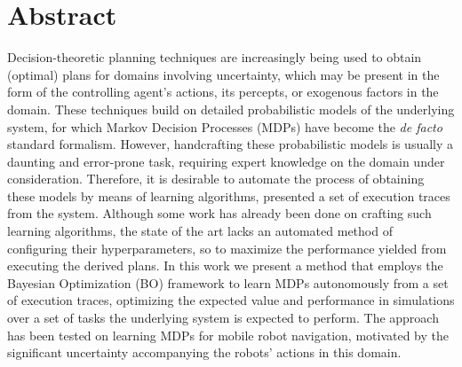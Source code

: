 \chapter*{Abstract}
\label{ch:abstract}

Decision-theoretic planning techniques are increasingly being used to obtain (optimal) plans for domains involving uncertainty, which may be present in the form of the controlling agent's actions, its percepts, or exogenous factors in the domain.
These techniques build on detailed probabilistic models of the underlying system, for which Markov Decision Processes (MDPs) have become the \textit{de facto} standard formalism.
However, handcrafting these probabilistic models is usually a daunting and error-prone task, requiring expert knowledge on the domain under consideration.
Therefore, it is desirable to automate the process of obtaining these models by means of learning algorithms, presented a set of execution traces from the system.
Although some work has already been done on crafting such learning algorithms, the state of the art lacks an automated method of configuring their hyperparameters, so to maximize the performance yielded from executing the derived plans.
In this work we present a method that employs the Bayesian Optimization (BO) framework to learn MDPs autonomously from a set of execution traces, optimizing the expected value and performance in simulations over a set of tasks the underlying system is expected to perform.
The approach has been tested on learning MDPs for mobile robot navigation, motivated by the significant uncertainty accompanying the robots' actions in this domain.


